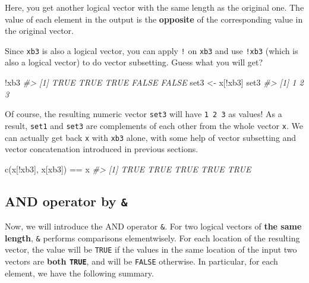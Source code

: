 \documentclass[
]{book}
\newenvironment{Shaded}{\begin{snugshade}}{\end{snugshade}}
\newcommand{\CommentTok}[1]{\textcolor[rgb]{0.56,0.35,0.01}{\textit{#1}}}
\newcommand{\FunctionTok}[1]{\textcolor[rgb]{0.00,0.00,0.00}{#1}}
\newcommand{\NormalTok}[1]{#1}
\newcommand{\OtherTok}[1]{\textcolor[rgb]{0.56,0.35,0.01}{#1}}
\newcommand{\SpecialCharTok}[1]{\textcolor[rgb]{0.00,0.00,0.00}{#1}}
\begin{document}
Here, you get another logical vector with the same length as the original one. The value of each element in the output is the \textbf{opposite} of the corresponding value in the original vector.

Since \texttt{xb3} is also a logical vector, you can apply \texttt{!} on \texttt{xb3} and use \texttt{!xb3} (which is also a logical vector) to do vector subsetting. Guess what you will get?

\begin{Shaded}
\begin{Highlighting}[]
\SpecialCharTok{!}\NormalTok{xb3}
\CommentTok{\#\textgreater{} [1]  TRUE  TRUE  TRUE FALSE FALSE}
\NormalTok{set3 }\OtherTok{\textless{}{-}}\NormalTok{ x[}\SpecialCharTok{!}\NormalTok{xb3]}
\NormalTok{set3}
\CommentTok{\#\textgreater{} [1] 1 2 3}
\end{Highlighting}
\end{Shaded}

Of course, the resulting numeric vector \texttt{set3} will have \texttt{1\ 2\ 3} as values! As a result, \texttt{set1} and \texttt{set3} are complements of each other from the whole vector \texttt{x}. We can actually get back \texttt{x} with \texttt{xb3} alone, with some help of vector subsetting and vector concatenation introduced in previous sections.

\begin{Shaded}
\begin{Highlighting}[]
\FunctionTok{c}\NormalTok{(x[}\SpecialCharTok{!}\NormalTok{xb3], x[xb3]) }\SpecialCharTok{==}\NormalTok{ x}
\CommentTok{\#\textgreater{} [1] TRUE TRUE TRUE TRUE TRUE}
\end{Highlighting}
\end{Shaded}

\hypertarget{and-operator-by}{%
\subsection{\texorpdfstring{AND operator by \texttt{\&}}{AND operator by \&}}\label{and-operator-by}}

Now, we will introduce the AND operator \texttt{\&}. For two logical vectors of \textbf{the same length}, \texttt{\&} performs comparisons elementwisely. For each location of the resulting vector, the value will be \texttt{TRUE} if the values in the same location of the input two vectors are \textbf{both \texttt{TRUE}}, and will be \texttt{FALSE} otherwise. In particular, for each element, we have the following summary.
\end{document}
